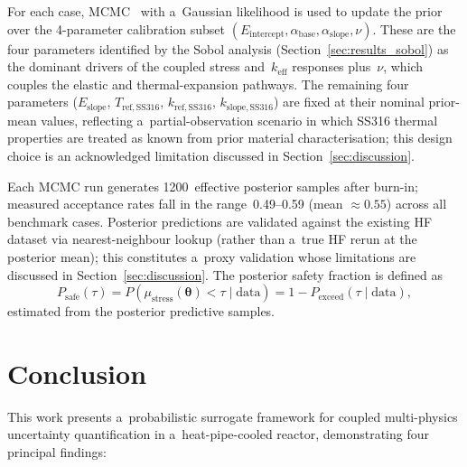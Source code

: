 \documentclass[pdflatex,sn-mathphys-num]{sn-jnl}
\theoremstyle{thmstyleone}
\theoremstyle{thmstyletwo}
\theoremstyle{thmstylethree}
\begin{document}
For each case, MCMC~\cite{ref:mcmc} with a~Gaussian likelihood is used to
update the prior over the 4-parameter calibration subset
$(E_{\mathrm{intercept}}, \alpha_{\mathrm{base}}, \alpha_{\mathrm{slope}}, \nu)$.
These are the four parameters identified by the Sobol analysis
(Section~\ref{sec:results_sobol}) as the dominant drivers of the coupled
stress and~$k_{\mathrm{eff}}$ responses plus~$\nu$, which couples the elastic
and thermal-expansion pathways.
The remaining four parameters ($E_{\mathrm{slope}}$, $T_{\mathrm{ref,SS316}}$,
$k_{\mathrm{ref,SS316}}$, $k_{\mathrm{slope,SS316}}$) are fixed at their
nominal prior-mean values, reflecting a~partial-observation scenario in which
SS316 thermal properties are treated as known from prior material
characterisation; this design choice is an acknowledged limitation discussed
in Section~\ref{sec:discussion}.

Each MCMC run generates 1200~effective posterior samples after burn-in;
measured acceptance rates fall in the range~0.49--0.59 (mean $\approx 0.55$)
across all benchmark cases.
Posterior predictions are validated against the existing HF dataset via
nearest-neighbour lookup (rather than a~true HF rerun at the posterior mean);
this constitutes a~proxy validation whose limitations are discussed in
Section~\ref{sec:discussion}.
The posterior safety fraction is defined as
\begin{equation}
  P_{\mathrm{safe}}(\tau) = P\!\left(\mu_{\mathrm{stress}}(\bm{\theta}) < \tau \mid \text{data}\right)
  = 1 - P_{\mathrm{exceed}}(\tau \mid \text{data}),
  \label{eq:psafe}
\end{equation}
estimated from the posterior predictive samples.

\section{Conclusion}\label{sec:conclusion}



This work presents a~probabilistic surrogate framework for coupled multi-physics
uncertainty quantification in a~heat-pipe-cooled reactor, demonstrating four
principal findings:
\end{document}
